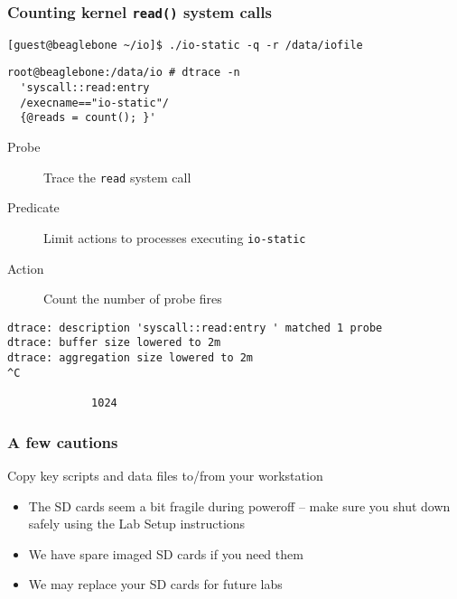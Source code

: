 \begin{frame}[fragile]
  \frametitle{Counting kernel \texttt{read()} system calls}

  \begin{small}
\begin{verbatim}
[guest@beaglebone ~/io]$ ./io-static -q -r /data/iofile
\end{verbatim}
  \end{small}

\smallskip

  \begin{small}
\begin{verbatim}
root@beaglebone:/data/io # dtrace -n
  'syscall::read:entry
  /execname=="io-static"/
  {@reads = count(); }'
\end{verbatim}
  \end{small}

  \begin{description}
    \item[Probe] Trace the \texttt{read} system call
    \item[Predicate] Limit actions to processes executing \texttt{io-static}
    \item[Action] Count the number of probe fires
  \end{description}

  \pause

  \begin{small}
\begin{verbatim}
dtrace: description 'syscall::read:entry ' matched 1 probe
dtrace: buffer size lowered to 2m
dtrace: aggregation size lowered to 2m
^C

             1024
\end{verbatim}
  \end{small}
\end{frame}

\begin{frame}
  \frametitle{A few cautions}

  Copy key scripts and data files to/from your workstation

  \begin{itemize}
    \item The SD cards seem a bit fragile during poweroff -- make sure you
      shut down safely using the Lab Setup instructions
    \item We have spare imaged SD cards if you need them
    \item We may replace your SD cards for future labs
  \end{itemize}
\end{frame}


